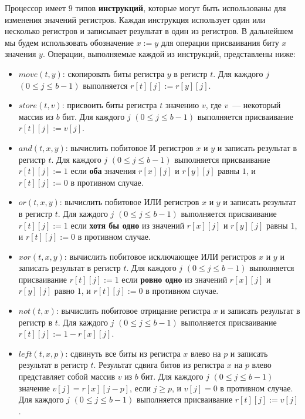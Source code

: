 Процессор имеет $9$ типов \textbf{инструкций}, которые могут быть использованы для изменения значений регистров. Каждая инструкция использует один или несколько регистров и записывает результат в один из регистров. В дальнейшем мы будем использовать обозначение $x := y$ для операции присваивания биту $x$ значения $y$. Операции, выполняемые каждой из инструкций, представлены ниже:
\begin{itemize}
\item $move(t,y)$: скопировать биты регистра $y$ в регистр $t$. Для каждого $j$ $(0 \leq j \leq b-1)$ выполняется $r[t][j] := r[y][j]$.

\item $store(t,v)$: присвоить биты регистра $t$ значению $v$, где $v$~--- некоторый массив из $b$ бит. Для каждого $j$ $(0 \leq j \leq b-1)$ выполняется присваивание $r[t][j] := v[j]$.

\item $and(t,x,y)$: вычислить побитовое И регистров $x$ и $y$ и записать результат в регистр $t$. Для каждого $j$ $(0 \leq j \leq b-1)$ выполняется присваивание $r[t][j] := 1$ если \textbf{оба} значения $r[x][j]$ и $r[y][j]$ равны $1$, и $r[t][j] := 0$ в противном случае.

\item $or(t,x,y)$: вычислить побитовое ИЛИ регистров $x$ и $y$ и записать результат в регистр $t$. Для каждого $j$ $(0 \leq j \leq b-1)$ выполняется присваивание $r[t][j] := 1$ если \textbf{хотя бы одно} из значений $r[x][j]$ и $r[y][j]$ равны $1$, и $r[t][j] := 0$ в противном случае.

\item $xor(t,x,y)$: вычислить побитовое исключающее ИЛИ регистров $x$ и $y$ и записать результат в регистр $t$. Для каждого $j$ $(0 \leq j \leq b-1)$ выполняется присваивание $r[t][j] := 1$ если \textbf{ровно одно} из значений $r[x][j]$ и $r[y][j]$ равно $1$, и $r[t][j] := 0$ в противном случае.

\item $not(t,x)$: вычислить побитовое отрицание регистра $x$ и записать результат в регистр в $t$. Для каждого $j$ $(0 \leq j \leq b-1)$ выполняется присваивание $r[t][j] := 1-r[x][j]$.

\item $left(t,x,p)$: сдвинуть все биты из регистра $x$ влево на $p$ и записать результат в регистр $t$. Результат сдвига битов из регистра $x$ на $p$ влево представляет собой массив $v$ из $b$ бит. Для каждого $j$ $(0 \leq j \leq b-1)$ значение $v[j] = r[x][j-p]$, если $j \geq p$, и $v[j] = 0$ в противном случае. Для каждого $j$ $(0 \leq j \leq b-1)$ выполняется присваивание $r[t][j] := v[j]$.


\end{itemize}
